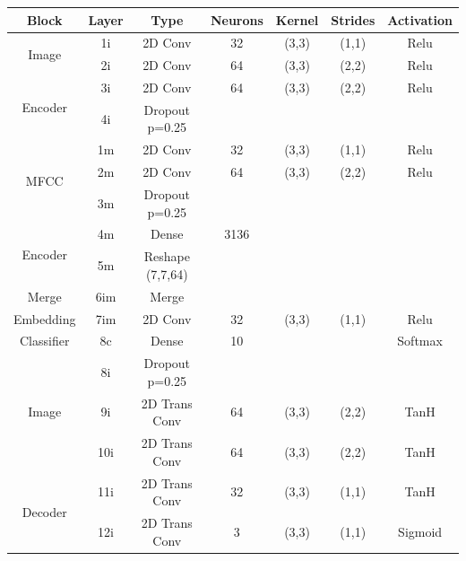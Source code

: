 	\begin{table}
		\centering
		\begin{tabular}{|c|c|c|c|c|c|c|}
			\hline
			\textbf{Block} & \textbf{Layer} & \textbf{Type} & \textbf{Neurons} & \textbf{Kernel} & \textbf{Strides} & \textbf{Activation}  \\ \hline
			\multirow{2}{*}{Image} & 1i	&	2D Conv & 32 & (3,3) & (1,1) & Relu \\ \cline{2-7}
			& 2i	&	2D Conv & 64 & (3,3) & (2,2) & Relu \\ \cline{2-7}
			\multirow{2}{*}{Encoder}& 3i	&	2D Conv & 64 & (3,3) & (2,2) & Relu \\ \cline{2-7}
			& 4i	&	Dropout p=0.25 &	 & 	     &       &  \\ \hline

			\multirow{3}{*}{MFCC} & 1m	&	2D Conv & 32 & (3,3) & (1,1) & Relu \\ \cline{2-7}
			& 2m	&	2D Conv & 64 & (3,3) & (2,2) & Relu \\ \cline{2-7}
			& 3m 	&	Dropout p=0.25 &	 & 	     &       & \\ \cline{2-7}
			\multirow{2}{*}{Encoder} & 4m	&	Dense          & 3136 & 	 &       & \\ \cline{2-7}
			& 5m  &	Reshape (7,7,64) & & & & \\ \hline

			Merge & 6im	& Merge & & & & \\ \hline
			Embedding& 7im	&	2D Conv & 32 & (3,3) & (1,1) & Relu \\ \hline
			Classifier & 8c	&	Dense          & 10 &       &       & Softmax \\ \hline

			\multirow{3}{*}{Image} & 8i 	&	Dropout p=0.25 &	 & 	     &       & \\ \cline{2-7}
			& 9i	&	2D Trans Conv & 64 & (3,3) & (2,2)  & TanH \\ \cline{2-7}
			& 10i	&	2D Trans Conv & 64 & (3,3) & (2,2)  & TanH \\ \cline{2-7}
			\multirow{2}{*}{Decoder}& 11i	&	2D Trans Conv & 32 & (3,3) & (1,1)  & TanH \\ \cline{2-7}
			& 12i	&	2D Trans Conv & 3 & (3,3) & (1,1) & Sigmoid\\ \hline 


\end{tabular}
\end{table}
